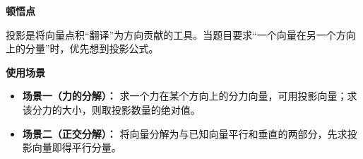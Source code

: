 \begin{explanationbox}
	\medskip
	\textbf{\textcolor{CExplanation}{顿悟点}}

	投影是将向量点积“翻译”为方向贡献的工具。当题目要求“一个向量在另一个方向上的分量”时，优先想到投影公式。

	\medskip
	\textbf{\textcolor{CExplanation}{使用场景}}
	\begin{itemize}[leftmargin=*, itemsep=0.5em, topsep=0.4em]
		\item \textbf{场景一（力的分解）：} 求一个力在某个方向上的分力向量，可用投影向量；求该分力的大小，则取投影数量的绝对值。
		\item \textbf{场景二（正交分解）：} 将向量分解为与已知向量平行和垂直的两部分，先求投影向量即得平行分量。
	\end{itemize}
\end{explanationbox}